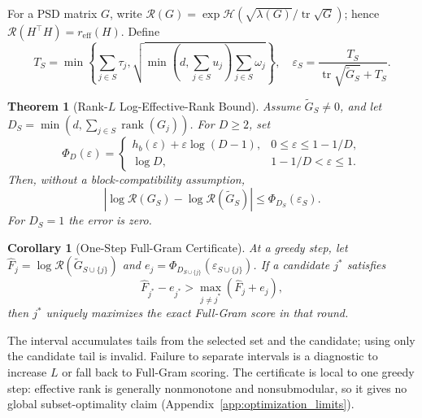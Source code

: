\documentclass{article}
\newcommand{\reff}{\ensuremath{r_{\mathrm{eff}}}\xspace}
\newtheorem{theorem}{Theorem}
\newtheorem{corollary}[lemma]{Corollary}
\begin{document}
For a PSD matrix $G$, write
$\mathcal R(G)=\exp\mathcal H(\sqrt{\lambda(G)}/
\operatorname{tr}\sqrt G)$; hence
$\mathcal R(H^\top H)=\reff(H)$.  Define
\begin{equation}
 T_S=\min\!\left\{\sum_{j\in S}\tau_j,
 \sqrt{\min(d,\sum_{j\in S}u_j)\sum_{j\in S}\omega_j}\right\},
 \quad
 \varepsilon_S=\frac{T_S}{\operatorname{tr}\sqrt{\widetilde G_S}+T_S}.
 \label{eq:tail_bound}
\end{equation}

\begin{theorem}[Rank-$L$ Log-Effective-Rank Bound]
\label{thm:rank_l_bound}
Assume $\widetilde G_S\neq0$, and let
$D_S=\min(d,\sum_{j\in S}\operatorname{rank}(G_j))$.  For $D\ge2$, set
\begin{equation}
 \Phi_D(\varepsilon)=
 \begin{cases}
 h_b(\varepsilon)+\varepsilon\log(D-1),
 &0\leq\varepsilon\leq1-1/D,\\
 \log D,&1-1/D<\varepsilon\leq1.
 \end{cases}
\end{equation}
Then, without a block-compatibility assumption,
\begin{equation}
 \left|\log\mathcal R(G_S)-\log\mathcal R(\widetilde G_S)\right|
 \leq \Phi_{D_S}(\varepsilon_S).
 \label{eq:rank_l_bound}
\end{equation}
For $D_S=1$ the error is zero.
\end{theorem}

\begin{corollary}[One-Step Full-Gram Certificate]
\label{cor:rank_l_choice}
At a greedy step, let
$\widehat F_j=\log\mathcal R(\widetilde G_{S\cup\{j\}})$ and
$e_j=\Phi_{D_{S\cup\{j\}}}(\varepsilon_{S\cup\{j\}})$.
If a candidate $j^*$ satisfies
\begin{equation}
 \widehat F_{j^*}-e_{j^*}>
 \max_{j\neq j^*}(\widehat F_j+e_j),
 \label{eq:rank_l_certificate}
\end{equation}
then $j^*$ uniquely maximizes the exact Full-Gram score in that round.
\end{corollary}

The interval accumulates tails from the selected set and the candidate;
using only the candidate tail is invalid.  Failure to separate intervals is
a diagnostic to increase $L$ or fall back to Full-Gram scoring.  The
certificate is local to one greedy step: effective rank is generally
nonmonotone and nonsubmodular, so it gives no global subset-optimality claim
(Appendix~\ref{app:optimization_limits}).
\end{document}
